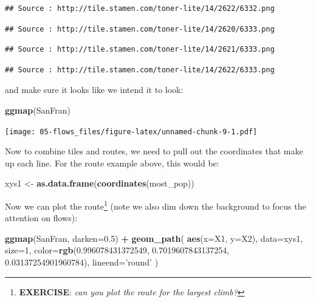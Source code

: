 \documentclass[
]{book}
\newenvironment{Shaded}{\begin{snugshade}}{\end{snugshade}}
\newcommand{\DataTypeTok}[1]{\textcolor[rgb]{0.13,0.29,0.53}{#1}}
\newcommand{\DecValTok}[1]{\textcolor[rgb]{0.00,0.00,0.81}{#1}}
\newcommand{\FloatTok}[1]{\textcolor[rgb]{0.00,0.00,0.81}{#1}}
\newcommand{\KeywordTok}[1]{\textcolor[rgb]{0.13,0.29,0.53}{\textbf{#1}}}
\newcommand{\NormalTok}[1]{#1}
\newcommand{\OperatorTok}[1]{\textcolor[rgb]{0.81,0.36,0.00}{\textbf{#1}}}
\newcommand{\StringTok}[1]{\textcolor[rgb]{0.31,0.60,0.02}{#1}}
\begin{document}
\begin{verbatim}
## Source : http://tile.stamen.com/toner-lite/14/2622/6332.png
\end{verbatim}

\begin{verbatim}
## Source : http://tile.stamen.com/toner-lite/14/2620/6333.png
\end{verbatim}

\begin{verbatim}
## Source : http://tile.stamen.com/toner-lite/14/2621/6333.png
\end{verbatim}

\begin{verbatim}
## Source : http://tile.stamen.com/toner-lite/14/2622/6333.png
\end{verbatim}

and make sure it looks like we intend it to look:

\begin{Shaded}
\begin{Highlighting}[]
\KeywordTok{ggmap}\NormalTok{(SanFran)}
\end{Highlighting}
\end{Shaded}

\texttt{[image: 05-flows\_files/figure-latex/unnamed-chunk-9-1.pdf]}

Now to combine tiles and routes, we need to pull out the coordinates that make up each line. For the route example above, this would be:

\begin{Shaded}
\begin{Highlighting}[]
\NormalTok{xys1 <-}\StringTok{ }\KeywordTok{as.data.frame}\NormalTok{(}\KeywordTok{coordinates}\NormalTok{(most_pop))}
\end{Highlighting}
\end{Shaded}

Now we can plot the route\footnote{\textbf{EXERCISE}: \emph{can you plot the route for the largest climb?}} (note we also dim down the background to focus the attention on flows):

\begin{Shaded}
\begin{Highlighting}[]
\KeywordTok{ggmap}\NormalTok{(SanFran, }\DataTypeTok{darken=}\FloatTok{0.5}\NormalTok{) }\OperatorTok{+}\StringTok{ }
\StringTok{  }\KeywordTok{geom_path}\NormalTok{(}
    \KeywordTok{aes}\NormalTok{(}\DataTypeTok{x=}\NormalTok{X1, }\DataTypeTok{y=}\NormalTok{X2), }
    \DataTypeTok{data=}\NormalTok{xys1,}
    \DataTypeTok{size=}\DecValTok{1}\NormalTok{,}
    \DataTypeTok{color=}\KeywordTok{rgb}\NormalTok{(}\FloatTok{0.996078431372549}\NormalTok{, }\FloatTok{0.7019607843137254}\NormalTok{, }\FloatTok{0.03137254901960784}\NormalTok{),}
    \DataTypeTok{lineend=}\StringTok{'round'}
\NormalTok{    )}
\end{Highlighting}
\end{Shaded}
\end{document}
